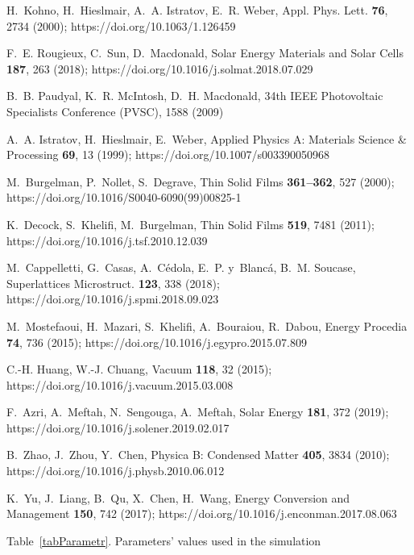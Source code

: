 \documentclass[12pt]{article}
\begin{document}
\begin{thebibliography}{99}
H.~Kohno, H.~Hieslmair, A.~A. Istratov, E.~R. Weber, Appl.
  Phys. Lett. \textbf{76}, 2734 (2000);
https://doi.org/10.1063/1.126459

F.~E. Rougieux, C.~Sun, D.~Macdonald,
Solar Energy Materials and Solar Cells \textbf{187}, 263 (2018);
https://doi.org/10.1016/j.solmat.2018.07.029

B.~B. {Paudyal}, K.~R. {McIntosh}, D.~H. {Macdonald},
  34th IEEE Photovoltaic Specialists Conference (PVSC), 1588 (2009)

A.~A. Istratov, H.~Hieslmair, E.~Weber,
  Applied Physics A: Materials Science \& Processing \textbf{69}, 13 (1999);
https://doi.org/10.1007/s003390050968

M.~Burgelman, P.~Nollet, S.~Degrave, Thin Solid Films \textbf{361--362}, 527 (2000);
https://doi.org/10.1016/S0040-6090(99)00825-1

K.~Decock, S.~Khelifi, M.~Burgelman, Thin Solid Films \textbf{519}, 7481 (2011);
https://doi.org/10.1016/j.tsf.2010.12.039

M.~Cappelletti, G.~Casas, A.~Cédola, E.~P. y~Blancá, B.~M. Soucase,
 Superlattices  Microstruct. \textbf{123}, 338 (2018);
https://doi.org/10.1016/j.spmi.2018.09.023

M.~Mostefaoui, H.~Mazari, S.~Khelifi, A.~Bouraiou, R.~Dabou,
 Energy Procedia \textbf{74}, 736  (2015);
https://doi.org/10.1016/j.egypro.2015.07.809

C.-H. Huang, W.-J. Chuang,
  Vacuum \textbf{118}, 32 (2015);
https://doi.org/10.1016/j.vacuum.2015.03.008

F.~Azri, A.~Meftah, N.~Sengouga, A.~Meftah,
Solar Energy \textbf{181}, 372 (2019);
https://doi.org/10.1016/j.solener.2019.02.017

B.~Zhao, J.~Zhou, Y.~Chen,
 Physica B: Condensed Matter \textbf{405}, 3834 (2010);
https://doi.org/10.1016/j.physb.2010.06.012

K.~Yu, J.~Liang, B.~Qu, X.~Chen, H.~Wang,
 Energy Conversion and Management \textbf{150}, 742 (2017);
https://doi.org/10.1016/j.enconman.2017.08.063

\end{thebibliography}


\newpage

Table~\ref{tabParametr}.
Parameters' values used in the simulation
\end{document}
